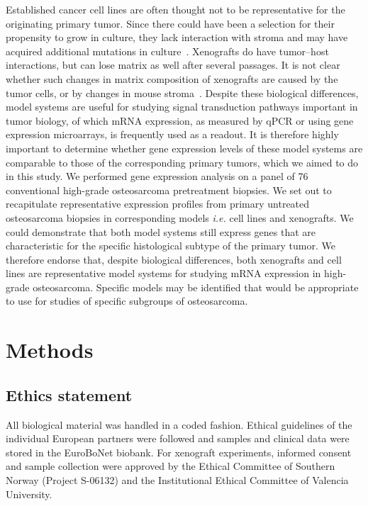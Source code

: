 Established cancer cell lines are often thought not to
be representative for the originating primary tumor.
Since there could have been a selection for their propensity
to grow in culture, they lack interaction with
stroma and may have acquired additional mutations in
culture~\cite{weinberg2007biology}. Xenografts do have tumor--host interactions,
but can lose matrix as well after several passages. It is
not clear whether such changes in matrix composition
of xenografts are caused by the tumor cells, or by
changes in mouse stroma~\cite{mayordomo2010tissue}. Despite these biological
differences, model systems are useful for studying signal
transduction pathways important in tumor biology, of
which mRNA expression, as measured by qPCR or
using gene expression microarrays, is frequently used as
a readout. It is therefore highly important to determine
whether gene expression levels of these model systems
are comparable to those of the corresponding primary
tumors, which we aimed to do in this study. We performed
gene expression analysis on a panel of 76 conventional
high\hyp{}grade osteosarcoma pretreatment
biopsies. We set out to recapitulate representative
expression profiles from primary untreated osteosarcoma
biopsies in corresponding models {\it i.e.} cell lines
and xenografts. We could demonstrate that both model
systems still express genes that are characteristic for the
specific histological subtype of the primary tumor. We
therefore endorse that, despite biological differences,
both xenografts and cell lines are representative model
systems for studying mRNA expression in high\hyp{}grade
osteosarcoma. Specific models may be identified that
would be appropriate to use for studies of specific subgroups
of osteosarcoma.

\section{Methods}\label{methods3}
\subsection{Ethics statement}
All biological material was handled in a coded fashion.
Ethical guidelines of the individual European partners
were followed and samples and clinical data were stored
in the EuroBoNet biobank. For xenograft experiments,
informed consent and sample collection were approved
by the Ethical Committee of Southern Norway (Project
S-06132) and the Institutional Ethical Committee of
Valencia University.

